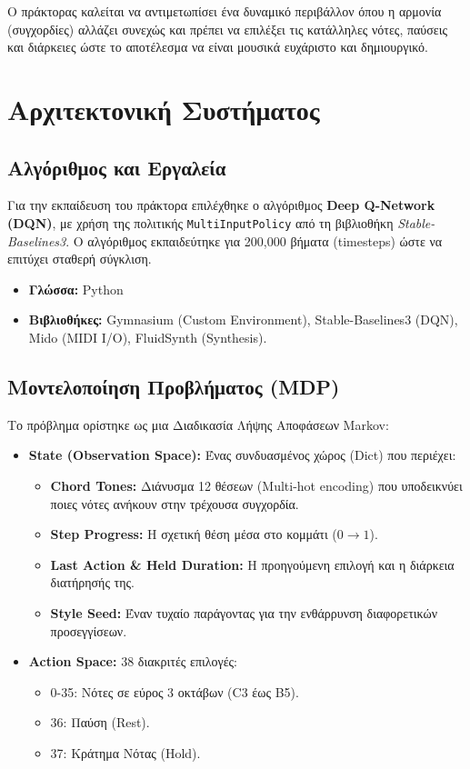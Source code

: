 \documentclass[11pt, a4paper]{article}
\begin{document}
Ο πράκτορας καλείται να αντιμετωπίσει ένα δυναμικό περιβάλλον όπου η αρμονία (συγχορδίες) αλλάζει συνεχώς και πρέπει να επιλέξει τις κατάλληλες νότες, παύσεις και διάρκειες ώστε το αποτέλεσμα να είναι μουσικά ευχάριστο και δημιουργικό.

\section{Αρχιτεκτονική Συστήματος}

\subsection{Αλγόριθμος και Εργαλεία}
Για την εκπαίδευση του πράκτορα επιλέχθηκε ο αλγόριθμος \textbf{Deep Q-Network (DQN)}, με χρήση της πολιτικής \texttt{MultiInputPolicy} από τη βιβλιοθήκη \textit{Stable-Baselines3}. Ο αλγόριθμος εκπαιδεύτηκε για 200,000 βήματα (timesteps) ώστε να επιτύχει σταθερή σύγκλιση.
\begin{itemize}
    \item \textbf{Γλώσσα:} Python
    \item \textbf{Βιβλιοθήκες:} Gymnasium (Custom Environment), Stable-Baselines3 (DQN), Mido (MIDI I/O), FluidSynth (Synthesis).
\end{itemize}

\subsection{Μοντελοποίηση Προβλήματος (MDP)}
Το πρόβλημα ορίστηκε ως μια Διαδικασία Λήψης Αποφάσεων Markov:
\begin{itemize}
    \item \textbf{State (Observation Space):} Ένας συνδυασμένος χώρος (Dict) που περιέχει:
    \begin{itemize}
        \item \textbf{Chord Tones:} Διάνυσμα 12 θέσεων (Multi-hot encoding) που υποδεικνύει ποιες νότες ανήκουν στην τρέχουσα συγχορδία.
        \item \textbf{Step Progress:} Η σχετική θέση μέσα στο κομμάτι ($0 \to 1$).
        \item \textbf{Last Action \& Held Duration:} Η προηγούμενη επιλογή και η διάρκεια διατήρησής της.
        \item \textbf{Style Seed:} Έναν τυχαίο παράγοντας για την ενθάρρυνση διαφορετικών προσεγγίσεων.
    \end{itemize}
    \item \textbf{Action Space:} 38 διακριτές επιλογές:
    \begin{itemize}
        \item 0-35: Νότες σε εύρος 3 οκτάβων (C3 έως B5).
        \item 36: Παύση (Rest).
        \item 37: Κράτημα Νότας (Hold).
    \end{itemize}
\end{itemize}
\end{document}

